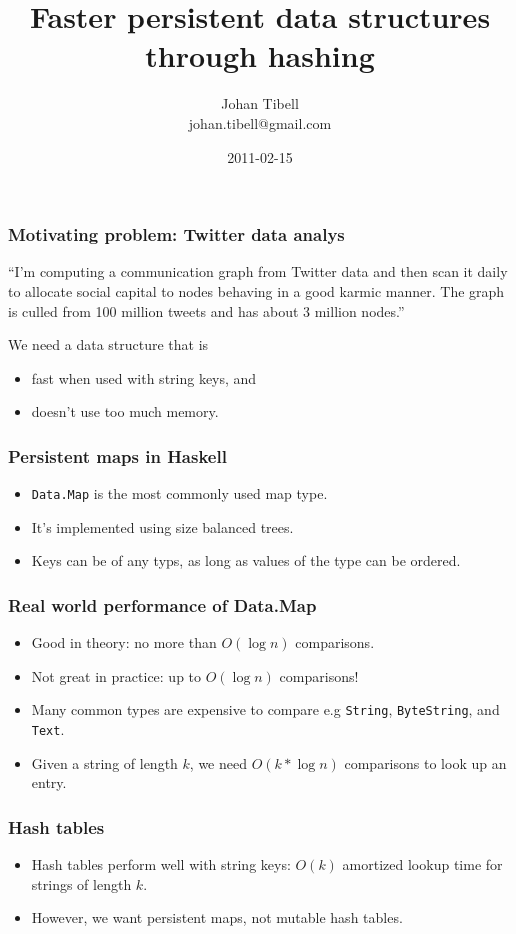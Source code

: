 \documentclass{beamer}
\title{Faster persistent data structures through hashing}
\author{Johan Tibell\\johan.tibell@gmail.com}
\date{2011-02-15}
\begin{document}
\lstset{language=Haskell}

\frame{\titlepage}

\begin{frame}
  \frametitle{Motivating problem: Twitter data analys}

  ``I'm computing a communication graph from Twitter data and then
  scan it daily to allocate social capital to nodes behaving in a good
  karmic manner.  The graph is culled from 100 million tweets and has
  about 3 million nodes.''

  \bigskip
  We need a data structure that is
  \begin{itemize}
  \item fast when used with string keys, and
  \item doesn't use too much memory.
  \end{itemize}
\end{frame}

\begin{frame}
  \frametitle{Persistent maps in Haskell}

  \begin{itemize}
  \item \lstinline!Data.Map! is the most commonly used map type.
  \item It's implemented using size balanced trees.
  \item Keys can be of any typs, as long as values of the type can be
    ordered.
  \end{itemize}
\end{frame}

\begin{frame}
  \frametitle{Real world performance of Data.Map}

  \begin{itemize}
  \item Good in theory: no more than $O(\log n)$ comparisons.
  \item Not great in practice: up to $O(\log n)$ comparisons!
  \item Many common types are expensive to compare e.g
    \lstinline!String!, \lstinline!ByteString!, and \lstinline!Text!.
  \item Given a string of length $k$, we need $O(k*\log n)$
    comparisons to look up an entry.
  \end{itemize}
\end{frame}

\begin{frame}
  \frametitle{Hash tables}
  \begin{itemize}
  \item Hash tables perform well with string keys: $O(k)$ amortized
    lookup time for strings of length $k$.
  \item However, we want persistent maps, not mutable hash tables.
  \end{itemize}
\end{frame}
\end{document}
